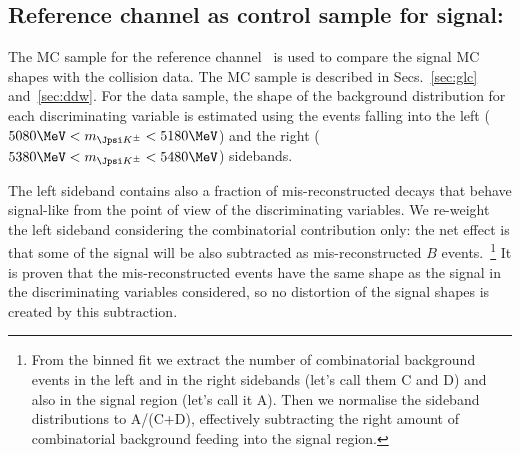   
\subsection{Reference channel as control sample for signal: \BpKpJpsi}
\label{sec:compsig}

The MC sample for the reference channel \BpKpJpsi\ is used to compare
the signal MC shapes with the collision data. The MC sample is
 described in Secs.~\ref{sec:glc}
and~\ref{sec:ddw}. For the data sample, the shape of the background
distribution for each discriminating variable is estimated using the
events falling into the left ($5080\MeV<m_{\Jpsi K^{\pm}}<5180\MeV$)
and the right ($5380\MeV<m_{\Jpsi K^{\pm}}<5480\MeV$) sidebands.

The left sideband contains also a fraction of mis-reconstructed decays
that behave signal-like from the point of view of the discriminating
variables. We re-weight the left sideband considering the combinatorial
contribution only: the net effect is that some of the signal will be
also subtracted as mis-reconstructed $B$ events.~\footnote{From the
binned fit we extract the number of combinatorial background events
in the left and in the right sidebands (let's call them C and D) and
also in the signal region (let's call it A).
Then we normalise the sideband distributions to A/(C+D), effectively
subtracting the right amount of combinatorial background feeding into
the signal region.}
It is proven that the mis-reconstructed events have the same shape as
the signal in the discriminating variables considered, so no distortion
of the signal shapes is created by this subtraction.

